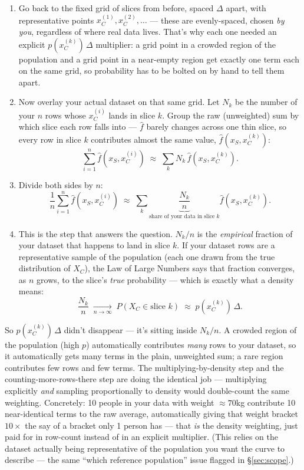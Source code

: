 \begin{enumerate}
  \item Go back to the fixed grid of slices from before, spaced $\Delta$
    apart, with representative points $x_C^{(1)},x_C^{(2)},\dots$ --- these
    are evenly-spaced, chosen \emph{by you}, regardless of where real data
    lives. That's why each one needed an explicit
    $p(x_C^{(k)})\,\Delta$ multiplier: a grid point in a crowded region of
    the population and a grid point in a near-empty region get exactly one
    term each on the same grid, so probability has to be bolted on by hand
    to tell them apart.
  \item Now overlay your actual dataset on that same grid. Let $N_k$ be the
    number of your $n$ rows whose $x_C^{(i)}$ lands in slice $k$. Group the
    raw (unweighted) sum by which slice each row falls into --- $\hat f$
    barely changes across one thin slice, so every row in slice $k$
    contributes almost the same value, $\hat f(x_S,x_C^{(k)})$:
    $$\sum_{i=1}^n \hat f(x_S,x_C^{(i)}) \;\approx\;
    \sum_k N_k\,\hat f(x_S,x_C^{(k)}).$$
  \item Divide both sides by $n$:
    $$\frac1n\sum_{i=1}^n \hat f(x_S,x_C^{(i)}) \;\approx\;
    \sum_k \underbrace{\frac{N_k}{n}}_{\text{share of your data in slice }k}
    \hat f(x_S,x_C^{(k)}).$$
  \item This is the step that answers the question. $N_k/n$ is the
    \emph{empirical} fraction of your dataset that happens to land in
    slice $k$. If your dataset rows are a representative sample of the
    population (each one drawn from the true distribution of $X_C$), the
    Law of Large Numbers says that fraction converges, as $n$ grows, to the
    slice's \emph{true} probability --- which is exactly what a density
    means:
    $$\frac{N_k}{n} \;\xrightarrow[n\to\infty]{}\; P(X_C\in\text{slice }k)
    \;\approx\; p(x_C^{(k)})\,\Delta.$$
\end{enumerate}
So $p(x_C^{(k)})\,\Delta$ didn't disappear --- it's sitting inside $N_k/n$.
A crowded region of the population (high $p$) automatically contributes
\emph{many} rows to your dataset, so it automatically gets many terms in
the plain, unweighted sum; a rare region contributes few rows and few
terms. The multiplying-by-density step and the counting-more-rows-there
step are doing the identical job --- multiplying explicitly \emph{and}
sampling proportionally to density would double-count the same weighting.
Concretely: 10 people in your data with weight $\approx 70$kg contribute
10 near-identical terms to the raw average, automatically giving that
weight bracket $10\times$ the say of a bracket only 1 person has ---
that \emph{is} the density weighting, just paid for in row-count instead
of in an explicit multiplier. (This relies on the dataset actually being
representative of the population you want the curve to describe --- the
same ``which reference population'' issue flagged in \S\ref{sec:scope}.)

